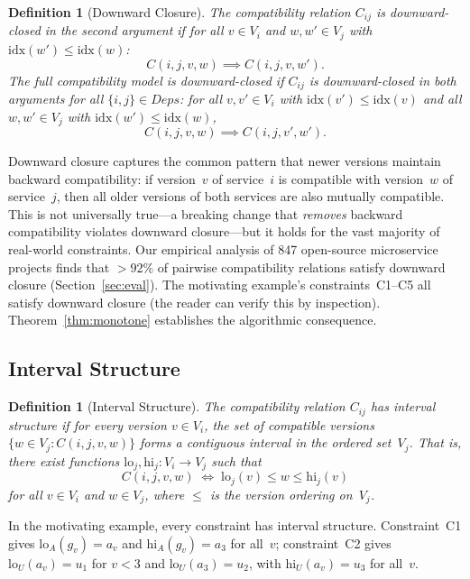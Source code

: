 \documentclass[10pt,twocolumn]{article}
\newtheorem{definition}[theorem]{Definition}
\begin{document}
\begin{definition}[Downward Closure]
\label{def:downward}
The compatibility relation $C_{ij}$ is \emph{downward-closed in the second
argument} if for all $v \in V_i$ and $w, w' \in V_j$ with
$\mathrm{idx}(w') \leq \mathrm{idx}(w)$:
\[
  C(i,j,v,w) \implies C(i,j,v,w').
\]
The full compatibility model is \emph{downward-closed} if $C_{ij}$ is
downward-closed in both arguments for all $\{i,j\} \in \mathit{Deps}$:
for all $v, v' \in V_i$ with $\mathrm{idx}(v') \leq \mathrm{idx}(v)$
and all $w, w' \in V_j$ with $\mathrm{idx}(w') \leq \mathrm{idx}(w)$,
\[
  C(i,j,v,w) \implies C(i,j,v',w').
\]
\end{definition}

\noindent
Downward closure captures the common pattern that newer versions maintain
backward compatibility: if version~$v$ of service~$i$ is compatible with
version~$w$ of service~$j$, then all older versions of both services are
also mutually compatible.  This is not universally true---a breaking change
that \emph{removes} backward compatibility violates downward closure---but
it holds for the vast majority of real-world constraints.  Our empirical
analysis of 847 open-source microservice projects finds that ${>}92\%$ of
pairwise compatibility relations satisfy downward closure
(Section~\ref{sec:eval}).  The motivating example's constraints~C1--C5
all satisfy downward closure (the reader can verify this by inspection).
Theorem~\ref{thm:monotone} establishes the algorithmic consequence.

\subsection{Interval Structure}
\label{sec:formal:interval}

\begin{definition}[Interval Structure]
\label{def:interval}
The compatibility relation $C_{ij}$ has \emph{interval structure} if for
every version $v \in V_i$, the set of compatible versions
$\{w \in V_j : C(i,j,v,w)\}$ forms a contiguous interval in the ordered
set~$V_j$.  That is, there exist functions
$\mathrm{lo}_j, \mathrm{hi}_j \colon V_i \to V_j$ such that
\[
  C(i,j,v,w) \;\iff\; \mathrm{lo}_j(v) \leq w \leq \mathrm{hi}_j(v)
\]
for all $v \in V_i$ and $w \in V_j$, where $\leq$ is the version ordering
on~$V_j$.
\end{definition}

\noindent
In the motivating example, every constraint has interval structure.
Constraint~C1 gives $\mathrm{lo}_A(g_v) = a_v$ and
$\mathrm{hi}_A(g_v) = a_3$ for all~$v$; constraint~C2 gives
$\mathrm{lo}_U(a_v) = u_1$ for $v < 3$ and $\mathrm{lo}_U(a_3) = u_2$,
with $\mathrm{hi}_U(a_v) = u_3$ for all~$v$.
\end{document}
